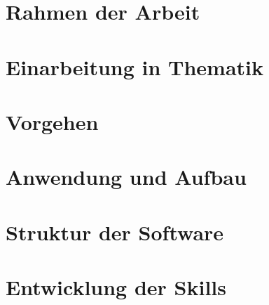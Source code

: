 \documentclass[
  a4paper,
  BCOR=15mm,            %
  twoside,
  bibliography=totoc,   %
  listof=totoc,         %
  monolingual,
  invert-title,
]{bfhthesis}
\begin{document}
\maketitle


\tableofcontents

\mainmatter

\chapter{Rahmen der Arbeit} \label{Rahmen der Arbeit}


\chapter{Einarbeitung in Thematik} \label{Einarbeitung in Thematik}




\chapter{Vorgehen} \label{Vorgehen}



\chapter{Anwendung und Aufbau} \label{Anwendung und Aufbau}




\chapter{Struktur der Software} \label{Struktur der Software}




\chapter{Entwicklung der Skills} \label{Entwicklung der Skills}







\end{document}
